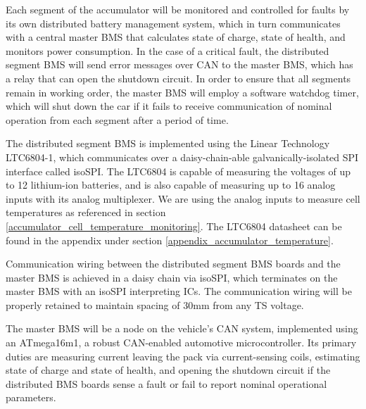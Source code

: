 \documentclass{article}
\begin{document}
Each segment of the accumulator will be monitored and controlled for faults by its own distributed battery management system, which in turn communicates with a central master BMS that calculates state of charge, state of health, and monitors power consumption. In the case of a critical fault, the distributed segment BMS will send error messages over CAN to the master BMS, which has a relay that can open the shutdown circuit. In order to ensure that all segments remain in working order, the master BMS will employ a software watchdog timer, which will shut down the car if it fails to receive communication of nominal operation from each segment after a period of time. 

The distributed segment BMS is implemented using the Linear Technology LTC6804-1, which communicates over a daisy-chain-able galvanically-isolated SPI interface called isoSPI. The LTC6804 is capable of measuring the voltages of up to 12 lithium-ion batteries, and is also capable of measuring up to 16 analog inputs with its analog multiplexer. We are using the analog inputs to measure cell temperatures as referenced in section \ref{accumulator_cell_temperature_monitoring}. The LTC6804 datasheet can be found in the appendix under section \ref{appendix_accumulator_temperature}. 



Communication wiring between the distributed segment BMS boards and the master BMS is achieved in a daisy chain via isoSPI, which terminates on the master BMS with an isoSPI interpreting ICs. The communication wiring will be properly retained to maintain spacing of 30mm from any TS voltage. 

The master BMS will be a node on the vehicle's CAN system, implemented using an ATmega16m1, a robust CAN-enabled automotive microcontroller. Its primary duties are measuring current leaving the pack via current-sensing coils, estimating state of charge and state of health, and opening the shutdown circuit if the distributed BMS boards sense a fault or fail to report nominal operational parameters. 
\end{document}
